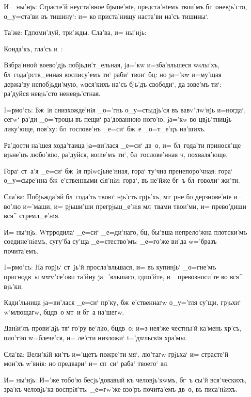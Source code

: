 И= ны'нjь: Страсте'й неуста'вное бjьше'нiе, 
предста'нiемъ твои'мъ бг~оневjь'сто, о_у=ста'ви въ 
тишину`: и= ко приста'нищу наста'ви на'съ тишины`.

Та'же: Гд поми'луй, три'жды. Сла'ва, и= ны'нjь:

Конда'къ, гла'съ и~:

Взбра'нной воево'дjь побjьди'т_ельная, jа='кw 
и=зба'вльшеся w\т sлы'хъ, бл~года'рств_енная воспису'емъ 
ти` раби` твои` бц: но jа='кw и=му'щая держа'ву 
непобjьди'мую, w\т вся'кихъ на'съ бjь'дъ свободи`, да 
зове'мъ ти`: ра'дуйся невjь'сто неневjь'стная.


I=рмо'съ: Бж~iя снизхожде'нiя _о='гнь о_у=стыдjь'ся въ 
вавv"лw'нjь и=ногда`, сегw` ра'ди _о='троцы въ пещи` 
ра'дованною ного'ю, jа='кw во цвjь'тницjь лику'юще, 
поя'ху: бл~гослове'нъ _е=си` бж~е _о=т_е'цъ на'шихъ.

Ра'дости на'шея хода'таица jа=ви'лася _е=си` дв~о, и= 
бл~года'ти принося'ще вjьне'цъ любо'вiю, ра'дуйся, 
вопiе'мъ ти`, бл~гослове'нная ч, похваля'юще.

Гора` ст~а'я _е=си` бж~iя прiwсjьне'нная, гора` ту'чна 
пренепоро'чная: гора` о_у=сыре'нна бж~е'ственными 
сiя'нiи: гора`, въ не'йже бг~ъ бл~говоли` жи'ти.

Сла'ва: Побjьжда'яй бл~года'ть твою` нjь'сть грjь'хъ, 
мт~рне бо дерзнове'нiе и= во'лю и='маши, и= рjьши'ши 
прегрjьш_е'нiя мл~твами твои'ми, и= прево'диши вся^ 
стремл_е'нiя.

И= ны'нjь: W\т тр родила` _е=си` _е=ди'наго, 
бц, бы'вша непрело'жна плотски'мъ соедине'нiемъ, 
сугу'ба су'ща _е=стество'мъ: _е=го'же ви'да w='бразъ 
почита'емъ.


I=рмо'съ: На горjь` ст~jь'й просла'вльшася, и= въ 
купинjь` _о=гне'мъ приснодв~ы мwv"се'ови та'йну 
jа='вльшаго, гд по'йте, и= превозноси'те во вся^ 
вjь'ки.

Кади'льница jа=ви'лася _е=си` пр'ку, 
бж~е'ственнагw о_у='гля су'щи, грjьхи` w'млющагw, 
бц дв~о мт~и бг~а на'шегw.

Данiи'лъ прови'дjь тя` го'ру ве'лiю, бц дв~о: и=з\ъ 
нея'же честны'й ка'мень хр'съ, пло'тiю w=блече'ся, и= 
ле'сти низложи` i='дwльскiя хра'мы.

Сла'ва: Вели'кiй ки'тъ и='щетъ пожре'ти мя`, лю'тагw 
грjьха` и= страсте'й мои'хъ w'янiя: но предвари` и= 
сп~си` раба` твоего` вл.

И= ны'нjь: И='же тобо'ю бесjь'довавый къ человjь'кwмъ, 
бг~ъ сы'й вся'ческихъ, зра'къ человjь'ка воспрiя'тъ: 
_е=гw'же взо'ръ почита'емъ дв~о, въ писа'нiихъ.

